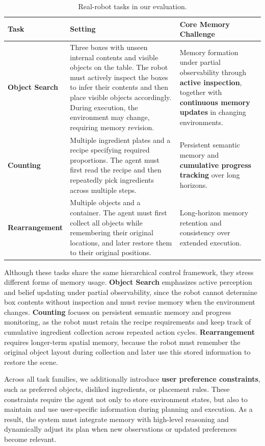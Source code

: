 \begin{table}[H]
\centering
\small
\setlength{\tabcolsep}{5pt}
\caption{Real-robot tasks in our evaluation.}
\begin{tabular}{p{2.3cm} p{5.2cm} p{5.0cm}}
\toprule
\textbf{Task} & \textbf{Setting} & \textbf{Core Memory Challenge} \\
\midrule
\textbf{Object Search} & 
Three boxes with unseen internal contents and visible objects on the table. The robot must actively inspect the boxes to infer their contents and then place visible objects accordingly. During execution, the environment may change, requiring memory revision. & 
Memory formation under partial observability through \textbf{active inspection}, together with \textbf{continuous memory updates} in changing environments. \\
\midrule
\textbf{Counting} & 
Multiple ingredient plates and a recipe specifying required proportions. The agent must first read the recipe and then repeatedly pick ingredients across multiple steps. & 
Persistent semantic memory and \textbf{cumulative progress tracking} over long horizons. \\
\midrule
\textbf{Rearrangement} & 
Multiple objects and a container. The agent must first collect all objects while remembering their original locations, and later restore them to their original positions. & 
Long-horizon memory retention and consistency over extended execution. \\
\bottomrule
\end{tabular}
\label{tab:task_design}
\end{table}

Although these tasks share the same hierarchical control framework, they stress different forms of memory usage. \textbf{Object Search} emphasizes active perception and belief updating under partial observability, since the robot cannot determine box contents without inspection and must revise memory when the environment changes. \textbf{Counting} focuses on persistent semantic memory and progress monitoring, as the robot must retain the recipe requirements and keep track of cumulative ingredient collection across repeated action cycles. \textbf{Rearrangement} requires longer-term spatial memory, because the robot must remember the original object layout during collection and later use this stored information to restore the scene.

Across all task families, we additionally introduce \textbf{user preference constraints}, such as preferred objects, disliked ingredients, or placement rules. These constraints require the agent not only to store environment states, but also to maintain and use user-specific information during planning and execution. As a result, the system must integrate memory with high-level reasoning and dynamically adjust its plan when new observations or updated preferences become relevant.

